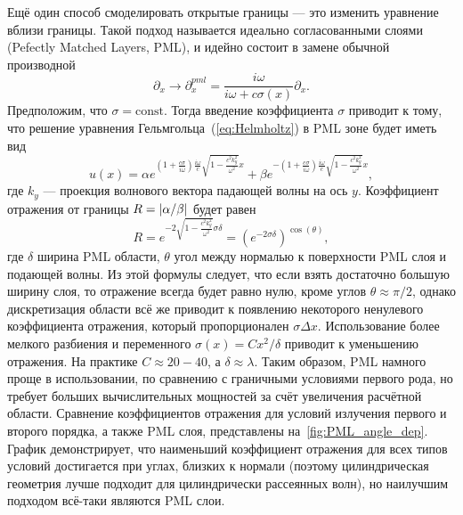 Ещё один способ смоделировать открытые границы --- это изменить уравнение вблизи границы. Такой подход называется идеально согласованными слоями (Pefectly Matched Layers, PML), и идейно состоит в замене обычной производной~\cite{nataf2013absorbing}
\begin{equation}
    \partial_x \to \partial^{pml}_x =\frac{i \omega}{i \omega + c \sigma(x) }\partial_x.
\end{equation}
Предположим, что $\sigma = \text{const}$. Тогда введение коэффициента $\sigma$ приводит к тому, что решение уравнения Гельмгольца~(\ref{eq:Helmholtz}) в PML зоне будет иметь вид 
\begin{equation}
    u(x) =\alpha e^{(1+\frac{c \sigma}{i \omega})\frac{i \omega}{c}\sqrt{1-\frac{c^2 k_y^2}{\omega^2}}x}+ \beta e^{-(1+\frac{c \sigma}{i \omega})\frac{i \omega}{c}\sqrt{1-\frac{c^2 k_y^2}{\omega^2}}x},
\end{equation}
где $k_y$ --- проекция волнового вектора падающей волны на ось $y$. Коэффициент отражения от границы $R = \lvert\alpha/\beta\rvert$ будет равен
\begin{equation}
    R = e^{-2\sqrt{1-\frac{c^2 k_y^2}{\omega^2}}\sigma \delta} = (e^{-2\sigma \delta})^{\cos(\theta)},
\end{equation}
где $\delta$ ширина PML области, $\theta$ угол между нормалью к поверхности PML слоя и подающей волны. Из этой формулы следует, что если взять достаточно большую ширину слоя, то отражение всегда будет равно нулю, кроме углов $\theta \approx \pi/2$, однако дискретизация области всё же приводит к появлению некоторого ненулевого коэффициента отражения, который пропорционален $\sigma \Delta x$. Использование более мелкого разбиения  и переменного $\sigma(x) = C x^2/\delta$ приводит к уменьшению отражения. На практике $C \approx 20-40$, а $\delta \approx \lambda$. Таким образом, PML намного проще в использовании, по сравнению с граничными условиями первого рода, но требует больших вычислительных мощностей за счёт увеличения расчётной области. Сравнение коэффициентов отражения для условий излучения первого и второго порядка, а также PML слоя, представлены на~\ref{fig:PML_angle_dep}. График демонстрирует, что наименьший коэффициент отражения для всех типов условий достигается при углах, близких к нормали (поэтому цилиндрическая геометрия лучше подходит для цилиндрически рассеянных волн), но  наилучшим подходом всё-таки являются PML слои.
